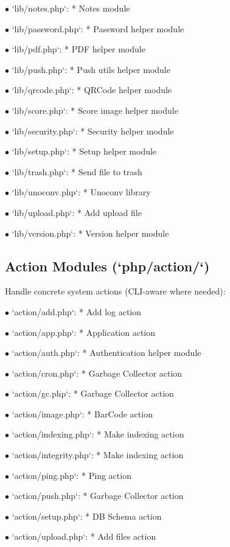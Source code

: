 \documentclass[a4paper]{article}
\begin{document}
\begin{compactitem}
\item[\color{myblue}$\bullet$] `lib/notes.php`: * Notes module
\item[\color{myblue}$\bullet$] `lib/password.php`: * Password helper module
\item[\color{myblue}$\bullet$] `lib/pdf.php`: * PDF helper module
\item[\color{myblue}$\bullet$] `lib/push.php`: * Push utils helper module
\item[\color{myblue}$\bullet$] `lib/qrcode.php`: * QRCode helper module
\item[\color{myblue}$\bullet$] `lib/score.php`: * Score image helper module
\item[\color{myblue}$\bullet$] `lib/security.php`: * Security helper module
\item[\color{myblue}$\bullet$] `lib/setup.php`: * Setup helper module
\item[\color{myblue}$\bullet$] `lib/trash.php`: * Send file to trash
\item[\color{myblue}$\bullet$] `lib/unoconv.php`: * Unoconv library
\item[\color{myblue}$\bullet$] `lib/upload.php`: * Add upload file
\item[\color{myblue}$\bullet$] `lib/version.php`: * Version helper module
\end{compactitem}

\hypertarget{toc6}{}
\subsection{Action Modules (`php/action/`)}

Handle concrete system actions (CLI-aware where needed):

\begin{compactitem}
\item[\color{myblue}$\bullet$] `action/add.php`: * Add log action
\item[\color{myblue}$\bullet$] `action/app.php`: * Application action
\item[\color{myblue}$\bullet$] `action/auth.php`: * Authentication helper module
\item[\color{myblue}$\bullet$] `action/cron.php`: * Garbage Collector action
\item[\color{myblue}$\bullet$] `action/gc.php`: * Garbage Collector action
\item[\color{myblue}$\bullet$] `action/image.php`: * BarCode action
\item[\color{myblue}$\bullet$] `action/indexing.php`: * Make indexing action
\item[\color{myblue}$\bullet$] `action/integrity.php`: * Make indexing action
\item[\color{myblue}$\bullet$] `action/ping.php`: * Ping action
\item[\color{myblue}$\bullet$] `action/push.php`: * Garbage Collector action
\item[\color{myblue}$\bullet$] `action/setup.php`: * DB Schema action
\item[\color{myblue}$\bullet$] `action/upload.php`: * Add files action
\end{compactitem}
\end{document}
